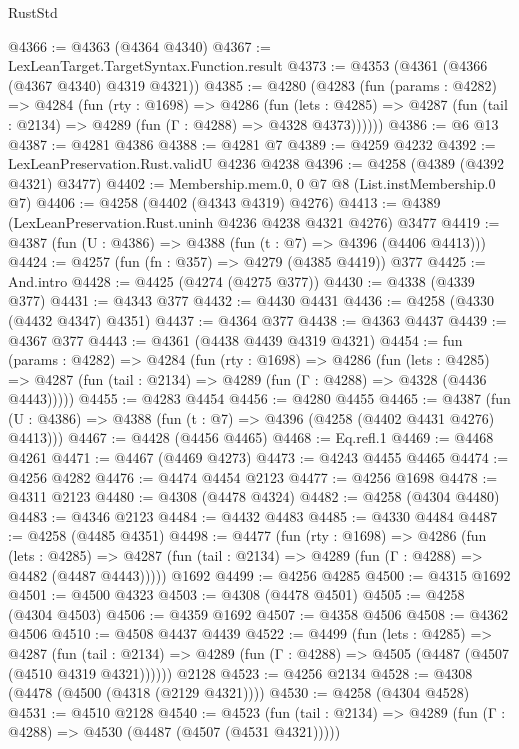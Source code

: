 \begin{lexlean}{RustStd}
\begin{coremodule}
@4366 := @4363 (@4364 @4340)
@4367 := LexLeanTarget.TargetSyntax.Function.result
@4373 := @4353 (@4361 (@4366 (@4367 @4340) @4319 @4321))
@4385 := @4280
    (@4283
      (fun (params : @4282) =>
      @4284
        (fun (rty : @1698) =>
        @4286
          (fun (lets : @4285) =>
          @4287 (fun (tail : @2134) => @4289 (fun (Γ : @4288) => @4328 @4373))))))
@4386 := @6 @13
@4387 := @4281 @4386
@4388 := @4281 @7
@4389 := @4259 @4232
@4392 := LexLeanPreservation.Rust.validU @4236 @4238
@4396 := @4258 (@4389 (@4392 @4321) @3477)
@4402 := Membership.mem.{0, 0} @7 @8 (List.instMembership.{0} @7)
@4406 := @4258 (@4402 (@4343 @4319) @4276)
@4413 := @4389 (LexLeanPreservation.Rust.uninh @4236 @4238 @4321 @4276) @3477
@4419 := @4387 (fun (U : @4386) => @4388 (fun (t : @7) => @4396 (@4406 @4413)))
@4424 := @4257 (fun (fn : @357) => @4279 (@4385 @4419)) @377
@4425 := And.intro
@4428 := @4425 (@4274 (@4275 @377))
@4430 := @4338 (@4339 @377)
@4431 := @4343 @377
@4432 := @4430 @4431
@4436 := @4258 (@4330 (@4432 @4347) @4351)
@4437 := @4364 @377
@4438 := @4363 @4437
@4439 := @4367 @377
@4443 := @4361 (@4438 @4439 @4319 @4321)
@4454 := fun (params : @4282) =>
  @4284
    (fun (rty : @1698) =>
    @4286
      (fun (lets : @4285) =>
      @4287 (fun (tail : @2134) => @4289 (fun (Γ : @4288) => @4328 (@4436 @4443)))))
@4455 := @4283 @4454
@4456 := @4280 @4455
@4465 := @4387 (fun (U : @4386) => @4388 (fun (t : @7) => @4396 (@4258 (@4402 @4431 @4276) @4413)))
@4467 := @4428 (@4456 @4465)
@4468 := Eq.refl.{1}
@4469 := @4468 @4261
@4471 := @4467 (@4469 @4273)
@4473 := @4243 @4455 @4465
@4474 := @4256 @4282
@4476 := @4474 @4454 @2123
@4477 := @4256 @1698
@4478 := @4311 @2123
@4480 := @4308 (@4478 @4324)
@4482 := @4258 (@4304 @4480)
@4483 := @4346 @2123
@4484 := @4432 @4483
@4485 := @4330 @4484
@4487 := @4258 (@4485 @4351)
@4498 := @4477
    (fun (rty : @1698) =>
    @4286
      (fun (lets : @4285) =>
      @4287 (fun (tail : @2134) => @4289 (fun (Γ : @4288) => @4482 (@4487 @4443)))))
    @1692
@4499 := @4256 @4285
@4500 := @4315 @1692
@4501 := @4500 @4323
@4503 := @4308 (@4478 @4501)
@4505 := @4258 (@4304 @4503)
@4506 := @4359 @1692
@4507 := @4358 @4506
@4508 := @4362 @4506
@4510 := @4508 @4437 @4439
@4522 := @4499
    (fun (lets : @4285) =>
    @4287
      (fun (tail : @2134) => @4289 (fun (Γ : @4288) => @4505 (@4487 (@4507 (@4510 @4319 @4321))))))
    @2128
@4523 := @4256 @2134
@4528 := @4308 (@4478 (@4500 (@4318 (@2129 @4321))))
@4530 := @4258 (@4304 @4528)
@4531 := @4510 @2128
@4540 := @4523
    (fun (tail : @2134) => @4289 (fun (Γ : @4288) => @4530 (@4487 (@4507 (@4531 @4321)))))

\end{coremodule}
\end{lexlean}
